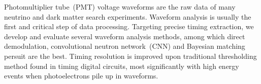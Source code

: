 Photomultiplier tube~(PMT) voltage waveforms are the raw data of many neutrino and dark matter search experiments.  Waveform analysis is usually the first and critical step of data processing.  Targeting precise timing extraction, we develop and evaluate several waveform analysis methods, among which direct demodulation, convolutional neutron network~(CNN) and Bayesian matching persuit are the best.  Timing resolution is improved upon traditional thresholding method found in timing digital circuits, most significantly with high energy events when photoelectrons pile up in waveforms.